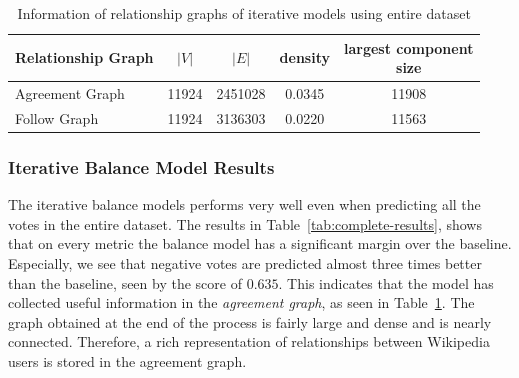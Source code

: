 \begin{table}[htp]
    \centering
    \caption{Information of relationship graphs of iterative models using entire \wikirfa dataset}
    \label{tab:iterative-graphs}
    \begin{tabular}{lcccc}
        \toprule
        Relationship Graph & $|V|$ & $|E|$ & density & \shortstack{largest component \\size}\\
        \midrule
        
        Agreement Graph& 11924 &2451028 & 0.0345 & 11908\\
        
        Follow Graph & 11924 & 3136303 & 0.0220 & 11563 \\


        \bottomrule
        \end{tabular}
\end{table}

\subsubsection{Iterative Balance Model Results}
The iterative balance models performs very well even when predicting all the votes in the entire \wikirfa dataset.
The results in Table~\ref{tab:complete-results}, shows that on every metric the balance model has a significant margin over the baseline.
Especially, we see that negative votes are predicted almost three times better than the baseline, seen by the \aucnegPR score of $0.635$.
This indicates that the model has collected useful information in the \textit{agreement graph}, as seen in Table~\ref{tab:iterative-graphs}.
The graph obtained at the end of the process is fairly large and dense and is nearly connected.
Therefore, a rich representation of relationships between Wikipedia users is stored in the agreement graph.

